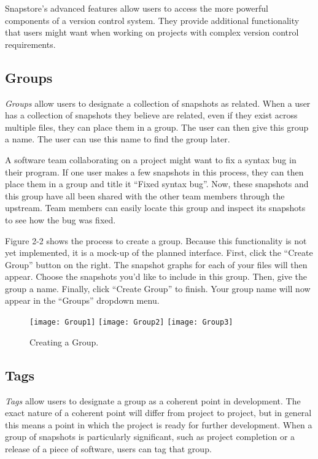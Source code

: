 Snapstore's advanced features allow users to access the more powerful components of a version control system. They provide additional functionality that users might want when working on projects with complex version control requirements.

\subsection{Groups}

\textit{Groups} allow users to designate a collection of snapshots as related. When a user has a collection of snapshots they believe are related, even if they exist across multiple files, they can place them in a group. The user can then give this group a name. The user can use this name to find the group later.

A software team collaborating on a project might want to fix a syntax bug in their program. If one user makes a few snapshots in this process, they can then place them in a group and title it ``Fixed syntax bug''. Now, these snapshots and this group have all been shared with the other team members through the upstream. Team members can easily locate this group and inspect its snapshots to see how the bug was fixed. 

Figure 2-2 shows the process to create a group. Because this functionality is not yet implemented, it is a mock-up of the planned interface. First, click the ``Create Group'' button on the right. The snapshot graphs for each of your files will then appear. Choose the snapshots you'd like to include in this group. Then, give the group a name. Finally, click ``Create Group'' to finish. Your group name will now appear in the ``Groups'' dropdown menu.

\begin{figure}
\begin{center}
\texttt{[image: Group1]}
\texttt{[image: Group2]}
\texttt{[image: Group3]}
\end{center}
\caption{Creating a Group.}
\label{arm:fig1}
\end{figure}

\subsection{Tags}

\textit{Tags} allow users to designate a group as a coherent point in development. The exact nature of a coherent point will differ from project to project, but in general this means a point in which the project is ready for further development. When a group of snapshots is particularly significant, such as project completion or a release of a piece of software, users can tag that group.


